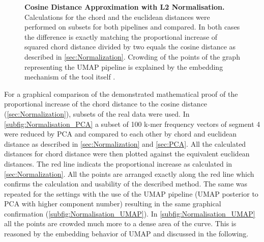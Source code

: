 \begin{figure}[!hbt]
\begin{subfigure}[b]{0.475\textwidth}
    \end{subfigure}
    \caption[Cosine Distance Approximation with L2 Normalisation]{\textbf{Cosine Distance Approximation with L2 Normalisation.} Calculations for the chord and the euclidean distances were performed on subsets for both pipelines and compared. In both cases the difference is exactly matching the proportional increase of squared chord distance divided by two equals the cosine distance as described in \autoref{sec:Normalization}. Crowding of the points of the graph representing the \gls{UMAP} pipeline is explained by the embedding mechanism of the tool itself \autocite{mcinnes_umap_2020}.}
    \label{fig:Normalisation_Methods}
\end{figure}

For a graphical comparison of the demonstrated mathematical proof of the proportional increase of the chord distance to the cosine distance (\autoref{sec:Normalization}), subsets of the real data were used. In \autoref{subfig:Normalisation_PCA} a subset of 100 k-mer frequency vectors of segment 4 were reduced by \gls{PCA} and compared to each other by chord and euclidean distance as described in \autoref{sec:Normalization} and \autoref{sec:PCA}. All the calculated distances for chord distance were then plotted against the equivalent euclidean distances. The red line indicats the proportional increase as calculated in \autoref{sec:Normalization}. All the points are arranged exactly along the red line which confirms the calculation and usability of the described method. The same was repeated for the settings with the use of the \gls{UMAP} pipeline (\gls{UMAP} posterior to \gls{PCA} with higher component number) resulting in the same graphical confirmation (\autoref{subfig:Normalisation_UMAP}). In \autoref{subfig:Normalisation_UMAP} all the points are crowded much more to a dense area of the curve. This is reasoned by the embedding behavior of \gls{UMAP} and discussed in the following.











